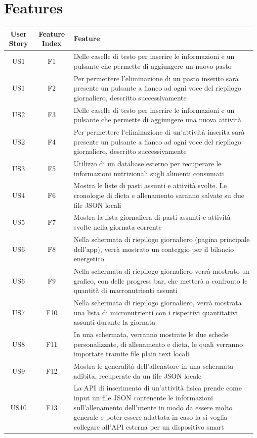 \documentclass{article}
\begin{document}
   \section{Features}
   \begin{center}
      \begin{tabular}{|c|c|p{10cm}|}
         \hline
         User Story & Feature Index & Feature\\
         \hline 
         US1 & F1 & Delle caselle di testo per inserire le informazioni e un pulsante che permette di aggiungere un nuovo pasto\\
         \hline
         US1 & F2 & Per permettere l’eliminazione di un pasto inserito sarà presente un pulsante a fianco ad ogni voce del riepilogo giornaliero, descritto successivamente\\
         \hline 
         US2 & F3 & Delle caselle di testo per inserire le informazioni e un pulsante che permette di aggiungere una nuova attività\\
         \hline
         US2 & F4 & Per permettere l’eliminazione di un’attività inserita sarà presente un pulsante a fianco ad ogni voce del riepilogo giornaliero, descritto successivamente\\
         \hline 
         US3 & F5 & Utilizzo di un database esterno per recuperare le informazioni nutrizionali sugli alimenti consumati\\
         \hline
         US4 & F6 & Mostra le liste di pasti assunti e attività svolte. Le cronologie di dieta e allenamento saranno salvate su due file JSON locali\\
         \hline
         US5 & F7 & Mostra la lista giornaliera di pasti assunti e attività svolte nella giornata corrente\\
         \hline 
         US6 & F8 & Nella schermata di riepilogo giornaliero (pagina principale dell’app), verrà mostrato un conteggio per il bilancio energetico\\
         \hline
         US6 & F9 & Nella schermata di riepilogo giornaliero verrà mostrato un grafico, con delle progress bar, che metterà a confronto le quantità di macronutrienti assunti\\
         \hline
         US7 & F10 & Nella schermata di riepilogo giornaliero, verrà mostrata una lista di micronutrienti con i rispettivi quantitativi assunti durante la giornata\\
         \hline
         US8 & F11 & In una schermata, verranno mostrate le due schede personalizzate, di allenamento e dieta, le quali verranno importate tramite file plain text locali\\
         \hline 
         US9 & F12 & Mostra le generalità dell’allenatore in una schermata adibita, recuperate da un file JSON locale\\
         \hline
         US10 & F13 & La API di inserimento di un’attività fisica prende come input un file JSON contenente le informazioni sull’allenamento dell’utente in modo da essere molto generale e poter essere adattata in caso la si voglia collegare all’API esterna per un dispositivo smart\\
         \hline         
      \end{tabular}
   \end{center}
   \newpage
\end{document}
